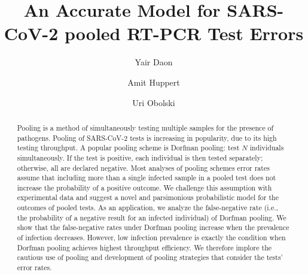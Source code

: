 \documentclass{article}
\begin{document}
\title{An Accurate Model for SARS-CoV-2 pooled RT-PCR Test Errors}

\author[1,2]{Yair Daon}
\author[1,3,*]{Amit Huppert}
\author[1,2,*]{Uri Obolski}



\date{}

\maketitle

\begin{abstract}
Pooling is a method of simultaneously testing multiple samples for the
presence of pathogens. Pooling of SARS-CoV-2 tests is increasing in
popularity, due to its high testing throughput. A popular pooling
scheme is Dorfman pooling: test $N$ individuals simultaneously. If the
test is positive, each individual is then tested separately;
otherwise, all are declared negative. Most analyses of pooling schemes
error rates assume that including more than a single infected sample
in a pooled test does not increase the probability of a positive
outcome. We challenge this assumption with experimental data and
suggest a novel and parsimonious probabilistic model for the outcomes
of pooled tests. As an application, we analyze the false-negative rate
(i.e., the probability of a negative result for an infected
individual) of Dorfman pooling. We show that the false-negative rates
under Dorfman pooling increase when the prevalence of infection
decreases. However, low infection prevalence is exactly the condition
when Dorfman pooling achieves highest throughput efficiency. We
therefore implore the cautious use of pooling and development of
pooling strategies that consider the tests' error rates.
\end{abstract}
\newpage
\end{document}
